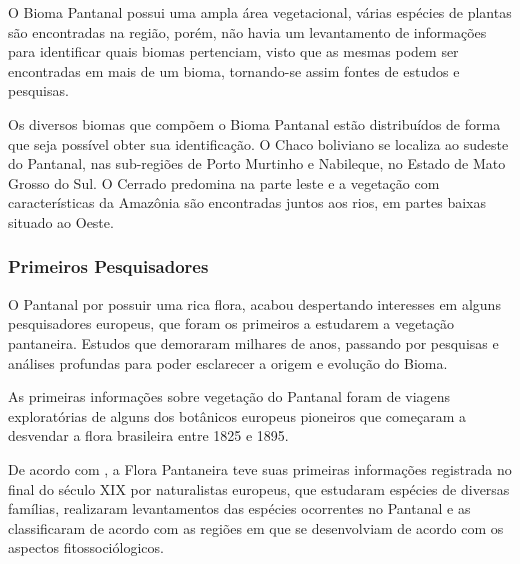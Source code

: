 O Bioma Pantanal possui uma ampla área vegetacional, várias espécies de plantas são encontradas na região, porém, não havia um levantamento de informações para  identificar  quais biomas pertenciam, visto que as mesmas podem ser encontradas em mais de um bioma, tornando-se assim fontes de estudos e pesquisas.		

Os diversos biomas que compõem o Bioma Pantanal estão distribuídos de forma que seja possível obter sua identificação. O Chaco boliviano se localiza ao sudeste do Pantanal, nas sub-regiões de Porto Murtinho e Nabileque, no Estado de Mato Grosso do Sul. O Cerrado predomina na parte leste e a vegetação com características da Amazônia são encontradas juntos aos rios, em partes baixas situado ao Oeste.

\subsubsection{Primeiros Pesquisadores}

O Pantanal por possuir uma rica flora, acabou despertando interesses em alguns pesquisadores europeus, que foram os primeiros a estudarem a vegetação pantaneira. Estudos que demoraram milhares de anos, passando por pesquisas e análises profundas para poder esclarecer a origem e evolução do Bioma.

\begin{citacao}
	As primeiras informações sobre vegetação do Pantanal foram de viagens exploratórias de alguns dos botânicos europeus pioneiros que começaram a desvendar a flora brasileira entre 1825 e 1895. \cite{pott2009vegetaccao}
\end{citacao}

De acordo com , a Flora Pantaneira teve suas primeiras informações registrada no final do século XIX por naturalistas europeus, que estudaram espécies de diversas famílias, realizaram levantamentos das espécies ocorrentes no Pantanal e as classificaram de acordo com as regiões em que se desenvolviam de acordo com os aspectos fitossociólogicos.


